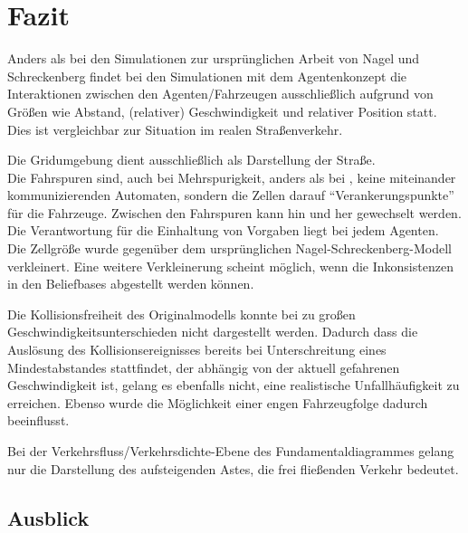\section{Fazit}
\label{sec:fazit}

Anders als bei den Simulationen zur ursprünglichen Arbeit von Nagel und Schreckenberg \cite{na-sch} findet bei den Simulationen mit dem Agentenkonzept %
die Interaktionen zwischen den Agenten/Fahrzeugen ausschließlich aufgrund von Größen wie Abstand, (relativer) Geschwindigkeit und relativer Position statt.
Dies ist vergleichbar zur Situation im realen Straßenverkehr.

Die Gridumgebung dient ausschließlich als Darstellung der Straße.
\\
Die Fahrspuren sind, auch bei Mehrspurigkeit, anders als bei \cite{multi-fuzzy}, keine miteinander kommunizierenden Automaten, sondern die Zellen darauf \enquote{Verankerungspunkte} für die Fahrzeuge.
Zwischen den Fahrspuren kann hin und her gewechselt werden.
Die Verantwortung für die Einhaltung von Vorgaben liegt bei jedem Agenten.
\\
Die Zellgröße wurde gegenüber dem ursprünglichen Nagel-Schreckenberg-Modell verkleinert.
Eine weitere Verkleinerung scheint möglich, wenn die Inkonsistenzen in den Beliefbases abgestellt werden können.

Die Kollisionsfreiheit des Originalmodells konnte bei zu großen Geschwindigkeitsunterschieden nicht dargestellt werden.
Dadurch dass die Auslösung des Kollisionsereignisses bereits bei Unterschreitung eines Mindestabstandes stattfindet, der abhängig von der aktuell gefahrenen Geschwindigkeit ist, gelang es ebenfalls nicht, eine realistische Unfallhäufigkeit zu erreichen.
Ebenso wurde die Möglichkeit einer engen Fahrzeugfolge dadurch beeinflusst.

Bei der Verkehrsfluss/Verkehrsdichte-Ebene des Fundamentaldiagrammes gelang nur die Darstellung des aufsteigenden Astes, die frei fließenden Verkehr bedeutet.






\subsection{Ausblick}
\label{sec:ausblick}

